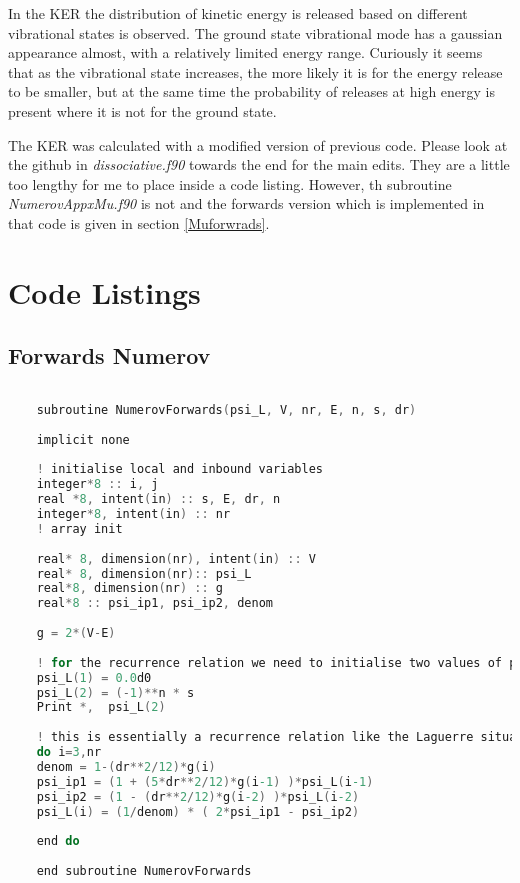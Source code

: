 \documentclass{article}
\begin{document}
	
	In the KER the distribution of kinetic energy is released based on different vibrational states is observed. The ground state vibrational mode has a gaussian appearance almost, with a relatively limited energy range. Curiously it seems that as the vibrational state increases, the more likely it is for the energy release to be smaller, but at the same time the probability of releases at high energy is present where it is not for the ground state.
	
	The KER was calculated with a modified version of previous code. Please look at the github in \textit{dissociative.f90} towards the end for the main edits. 
	They are a little too lengthy for me to place inside a code listing. However, th subroutine \textit{NumerovAppxMu.f90} is not and the forwards version which is implemented in that code is given in section \ref{Muforwrads}.
	
\pagebreak
    \section{Code Listings}
    \subsection{Forwards Numerov}
    \begin{lstlisting}[language=C, label=Forwards]
    	
    subroutine NumerovForwards(psi_L, V, nr, E, n, s, dr)
    
    implicit none
    
    ! initialise local and inbound variables
    integer*8 :: i, j
    real *8, intent(in) :: s, E, dr, n
    integer*8, intent(in) :: nr
    ! array init
    
    real* 8, dimension(nr), intent(in) :: V
    real* 8, dimension(nr):: psi_L
    real*8, dimension(nr) :: g
    real*8 :: psi_ip1, psi_ip2, denom
    
    g = 2*(V-E)
    
    ! for the recurrence relation we need to initialise two values of psi
    psi_L(1) = 0.0d0
    psi_L(2) = (-1)**n * s
    Print *,  psi_L(2)
    
    ! this is essentially a recurrence relation like the Laguerre situation
    do i=3,nr
    denom = 1-(dr**2/12)*g(i)
    psi_ip1 = (1 + (5*dr**2/12)*g(i-1) )*psi_L(i-1)
    psi_ip2 = (1 - (dr**2/12)*g(i-2) )*psi_L(i-2)
    psi_L(i) = (1/denom) * ( 2*psi_ip1 - psi_ip2)
    
    end do
    
    end subroutine NumerovForwards
    	
    \end{lstlisting}
\end{document}

